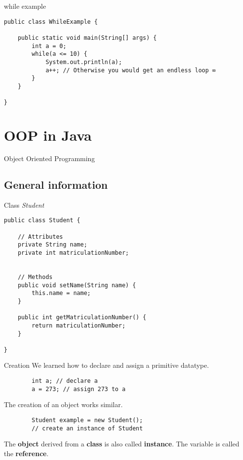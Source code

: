 \begin{frame}[fragile]{while example}
\begin{lstlisting}
public class WhileExample {

	public static void main(String[] args) {
		int a = 0;
		while(a <= 10) {
			System.out.println(a);
            a++; // Otherwise you would get an endless loop ∞
		}
	}
    
}
\end{lstlisting}
\end{frame}


\section{OOP in Java}

\begin{frame}{}
	\begin{center}
		{\huge Object Oriented Programming}
	\end{center}
\end{frame}

\subsection{General information}

\begin{frame}[fragile]{Class \emph{Student}}
\begin{lstlisting}
public class Student {

	// Attributes
	private String name; 
	private int matriculationNumber; 
	
	
	// Methods
	public void setName(String name) {
		this.name = name;
	}
    
	public int getMatriculationNumber() {
		return matriculationNumber;
	}
    
}
\end{lstlisting}


\end{frame}

\begin{frame}[fragile]{Creation}
	We learned how to declare and assign a primitive datatype.
	
	\begin{lstlisting}
	    int a; // declare a
	    a = 273; // assign 273 to a
	\end{lstlisting} 
	
	The creation of an object works similar.
	
	\begin{lstlisting}
	    Student example = new Student(); 
		// create an instance of Student
	\end{lstlisting}
	The \textbf{object} derived from a \textbf{class} is also called \textbf{instance}.
	The variable is called the \textbf{reference}.
\end{frame}

